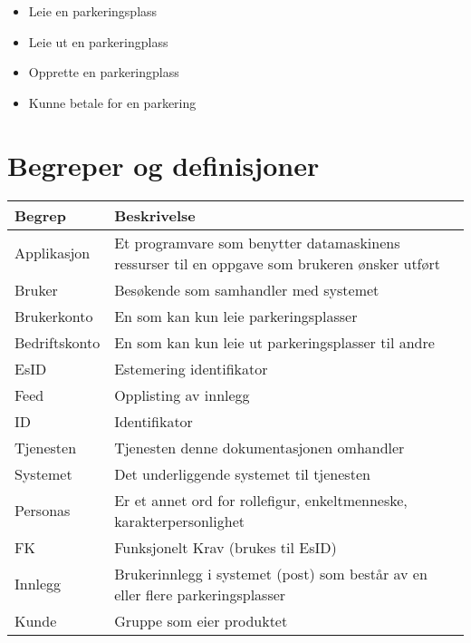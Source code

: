 \documentclass[12pt]{article}
\begin{document}
    \begin{itemize}
        \item Leie en parkeringsplass
        \item Leie ut en parkeringplass
        \item Opprette en parkeringplass
        \item Kunne betale for en parkering
    \end{itemize}

\section{Begreper og definisjoner}

\begin{center}
    \begin{tabular}{|p{4cm}|p{12cm}| } 
        \hline
        \bf Begrep & \bf Beskrivelse \\
        \hline
        Applikasjon &  Et programvare som benytter datamaskinens ressurser til en oppgave som brukeren ønsker utført \\
        \hline
        Bruker & Besøkende som samhandler med systemet \\
        \hline
        Brukerkonto & En som kan kun leie parkeringsplasser \\
        \hline
        Bedriftskonto & En som kan kun leie ut parkeringsplasser til andre \\
        \hline
        EsID & Estemering identifikator \\
        \hline
        Feed & Opplisting av innlegg \\
        \hline
        ID & Identifikator \\
        \hline
        Tjenesten & Tjenesten denne dokumentasjonen omhandler \\
        \hline
        Systemet & Det underliggende systemet til tjenesten \\
        \hline
        Personas & Er et annet ord for rollefigur, enkeltmenneske, karakterpersonlighet\\
        \hline
        FK & Funksjonelt Krav (brukes til EsID)\\
        \hline
        Innlegg & Brukerinnlegg i systemet (post) som består av en eller flere parkeringsplasser\\
        \hline
        Kunde & Gruppe som eier produktet\\
        \hline
    \end{tabular}
\end{center}
\end{document}
